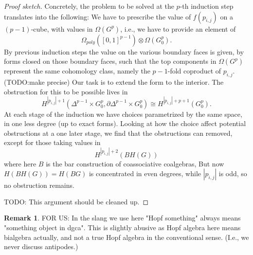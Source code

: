 \documentclass[a4paper]{amsart}
\theoremstyle{plain}
\theoremstyle{definition}
\newtheorem{rem}[thm]{Remark}
\newcommand{\dgca}{\mathsf{Dgca}}
\renewcommand{\mod}{\mathrm{mod}}
\newcommand{\hdgca}{h\dgca}
\begin{document}
\begin{proof}[Proof sketch]
Concretely, the problem to be solved at the $p$-th induction step translates into the following:
We have to prescribe the value of $f(p_{i,j})$ on a $(p-1)$-cube, with values in $\Omega(G^p)$, i.e., we have to provide an element of 
\[
\Omega_{poly}([0,1]^{p-1})\otimes \Omega(G_0^p).
\]
By previous induction steps the value on the various boundary faces is given, by forms closed on those boundary faces, such that the top components in $\Omega(G^p)$ represent the same cohomology class, namely the $p-1$-fold coproduct of $p_{i,j}$. (TODO:make precise) Our task is to extend the form to the interior.
The obstruction for this to be possible lives in
\[
H^{|p_{i,j}|+1}(\Delta^{p-1}\times G_0^p, \partial\Delta^{p-1}\times G_0^p)\cong H^{|p_{i,j}|+p+1}(G_0^p).
\]
At each stage of the induction we have choices parametrized by the same space, in one less degree (up to exact forms).
Looking at how the choice affect potential obstructions at a one later stage, we find that the obstructions can removed, except for those taking values in 
\[
H^{|p_{i,j}|+2}(BH(G))
\]
where here $B$ is the bar construction of coassociative coalgebras, But now $H(BH(G))=H(BG)$ is concentrated in even degrees, while $|p_{i,j}|$ is odd, so no obstruction remains.

TODO: This argument should be cleaned up.

\end{proof}


\begin{rem}
FOR US: In the slang we use here "Hopf something" always means "something object in dgca". This is slightly abusive as Hopf algebra here means bialgebra actually, and not a true Hopf algebra in the conventional sense. (I.e., we never discuss antipodes.)
\end{rem}





\end{document}
